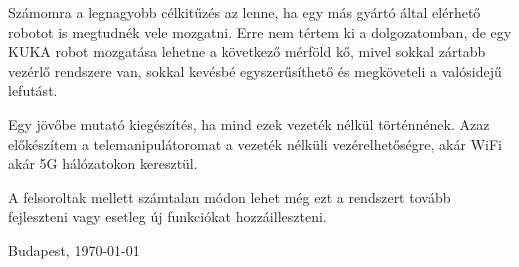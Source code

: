 Számomra a legnagyobb célkitűzés az lenne, ha egy más gyártó által elérhető robotot is megtudnék vele mozgatni. Erre nem tértem ki a dolgozatomban, de egy KUKA robot mozgatása lehetne a következő mérföld kő, mivel sokkal zártabb vezérlő rendszere van, sokkal kevésbé egyszerűsíthető és megköveteli a valósidejű lefutást.

Egy jövőbe mutató kiegészítés, ha mind ezek vezeték nélkül történnének. Azaz előkészítem a telemanipulátoromat a vezeték nélküli vezérelhetőségre, akár WiFi akár 5G hálózatokon keresztül.

A felsoroltak mellett számtalan módon lehet még ezt a rendszert tovább fejleszteni vagy esetleg új funkciókat hozzáilleszteni.

\vspace{0.5cm}

\begin{flushleft}
{Budapest, \today}
\end{flushleft}

\begin{flushright}
\emph{\authorName}
\end{flushright}

\vfill

